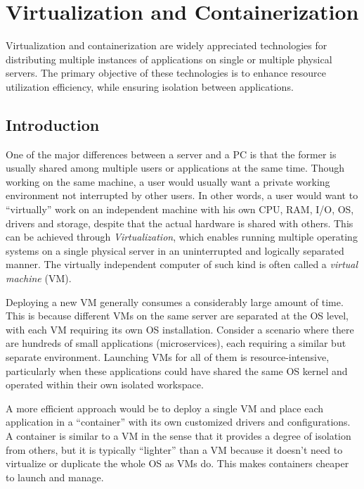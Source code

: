 \chapter{Virtualization and Containerization}

Virtualization and containerization are widely appreciated technologies for distributing multiple instances of applications on single or multiple physical servers. The primary objective of these technologies is to enhance resource utilization efficiency, while ensuring isolation between applications.

\section{Introduction}

One of the major differences between a server and a PC is that the former is usually shared among multiple users or applications at the same time. Though working on the same machine, a user would usually want a private working environment not interrupted by other users. In other words, a user would want to ``virtually'' work on an independent machine with his own CPU, RAM, I/O, OS, drivers and storage, despite that the actual hardware is shared with others. This can be achieved through \textit{Virtualization}, which enables running multiple operating systems on a single physical server in an uninterrupted and logically separated manner. The virtually independent computer of such kind is often called a \textit{virtual machine} (VM).

Deploying a new VM generally consumes a considerably large amount of time. This is because different VMs on the same server are separated at the OS level, with each VM requiring its own OS installation. Consider a scenario where there are hundreds of small applications (microservices), each requiring a similar but separate environment. Launching VMs for all of them is resource-intensive, particularly when these applications could have shared the same OS kernel and operated within their own isolated workspace.

A more efficient approach would be to deploy a single VM and place each application in a ``container'' with its own customized drivers and configurations. A container is similar to a VM in the sense that it provides a degree of isolation from others, but it is typically ``lighter'' than a VM because it doesn't need to virtualize or duplicate the whole OS as VMs do. This makes containers cheaper to launch and manage.

